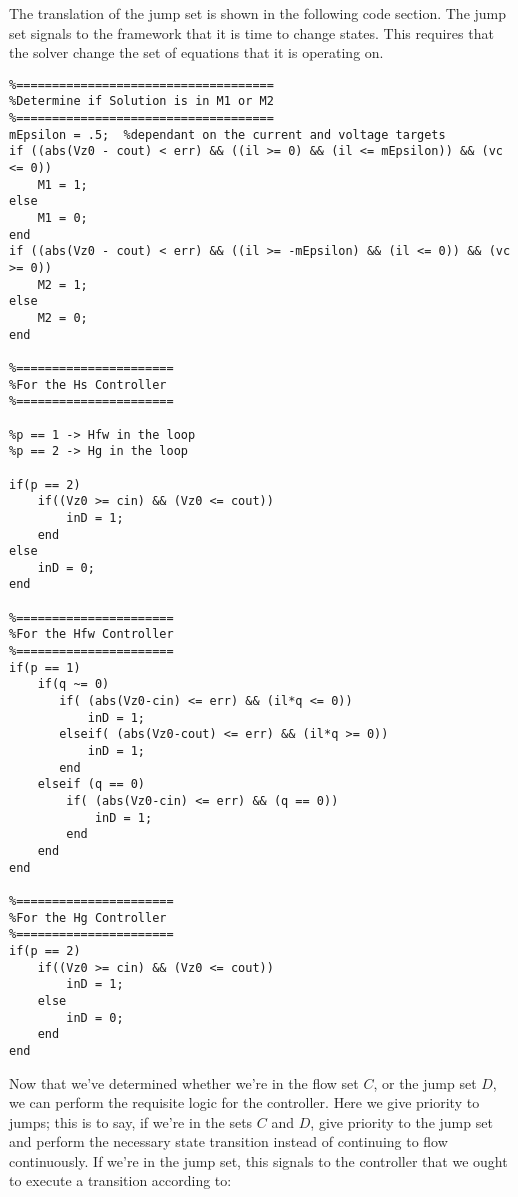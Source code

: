The translation of the jump set is shown in the following code section. The jump set signals to the framework that it is time to change states. This requires that the solver change the set of equations that it is operating on.

\begin{lstlisting}
%====================================
%Determine if Solution is in M1 or M2
%====================================
mEpsilon = .5;	%dependant on the current and voltage targets
if ((abs(Vz0 - cout) < err) && ((il >= 0) && (il <= mEpsilon)) && (vc <= 0))
    M1 = 1;
else
    M1 = 0;
end
if ((abs(Vz0 - cout) < err) && ((il >= -mEpsilon) && (il <= 0)) && (vc >= 0))
    M2 = 1;
else
    M2 = 0;
end

%======================
%For the Hs Controller
%======================

%p == 1 -> Hfw in the loop
%p == 2 -> Hg in the loop

if(p == 2)
    if((Vz0 >= cin) && (Vz0 <= cout))
        inD = 1;
    end
else
    inD = 0;    
end

%======================
%For the Hfw Controller
%======================
if(p == 1)
    if(q ~= 0)
       if( (abs(Vz0-cin) <= err) && (il*q <= 0))
           inD = 1;
       elseif( (abs(Vz0-cout) <= err) && (il*q >= 0))
           inD = 1;
       end
    elseif (q == 0)
        if( (abs(Vz0-cin) <= err) && (q == 0))
            inD = 1;
        end   
    end
end

%======================
%For the Hg Controller
%======================
if(p == 2)
    if((Vz0 >= cin) && (Vz0 <= cout))
        inD = 1;
    else
        inD = 0;
    end
end
\end{lstlisting}

Now that we've determined whether we're in the flow set $C$, or the jump set $D$, we can perform the requisite logic for the controller. Here we give priority to jumps; this is to say, if we're in the sets $C$ and $D$, give priority to the jump set and perform the necessary state transition instead of continuing to flow continuously. If we're in the jump set, this signals to the controller that we ought to execute a transition according to:


